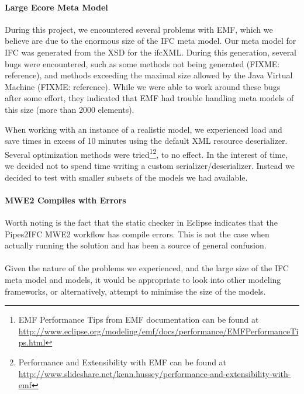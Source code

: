 \paragraph{Large Ecore Meta Model} During this project, we encountered several problems with EMF, which we believe are due to the enormous size of the IFC meta model. Our meta model for IFC was generated from the XSD for the ifcXML. During this generation, several bugs were encountered, such as some methods not being generated (FIXME: reference), and methods exceeding the maximal size allowed by the Java Virtual Machine (FIXME: reference). While we were able to work around these bugs after some effort, they indicated that EMF had trouble handling meta models of this size (more than 2000 elements).

When working with an instance of a realistic model, we experienced load and save times in excess of 10 minutes using the default XML resource deserializer. Several optimization methods were tried\footnote{EMF Performance Tips from EMF documentation can be found at \url{http://www.eclipse.org/modeling/emf/docs/performance/EMFPerformanceTips.html}}\footnote{Performance and Extensibility with EMF can be found at \url{http://www.slideshare.net/kenn.hussey/performance-and-extensibility-with-emf}}, to no effect. In the interest of time, we decided not to spend time writing a custom serializer/deserializer. Instead we decided to test with smaller subsets of the models we had available.

\paragraph{MWE2 Compiles with Errors} Worth noting is the fact that the static checker in Eclipse indicates that the Pipes2IFC MWE2 workflow has compile errors. This is not the case when actually running the solution and has been a source of general confusion.

\paragraph{}
Given the nature of the problems we experienced, and the large size of the IFC meta model and models, it would be appropriate to look into other modeling frameworks, or alternatively, attempt to minimise the size of the models.

